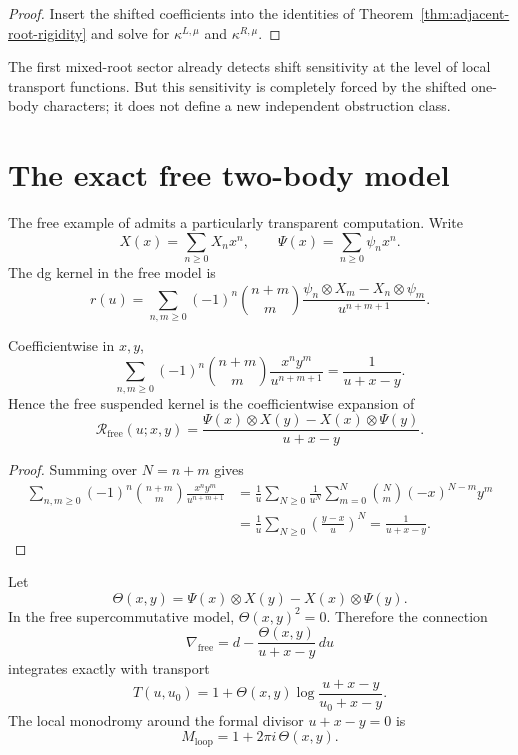 \begin{proof}
Insert the shifted coefficients into the identities of
Theorem~\ref{thm:adjacent-root-rigidity} and solve for
$\kappa^{L,\mu}$ and $\kappa^{R,\mu}$.
\end{proof}

\begin{interpretation}
The first mixed-root sector already detects shift sensitivity at the
level of local transport functions. But this sensitivity is completely
forced by the shifted one-body characters; it does not define a new
independent obstruction class.
\end{interpretation}

\section{The exact free two-body model}

The free example of \cite{DNP25} admits a particularly transparent
computation. Write
\[
X(x)=\sum_{n\ge 0} X_n x^n,
\qquad
\Psi(x)=\sum_{n\ge 0} \psi_n x^n.
\]
The dg kernel in the free model is
\[
r(u)=\sum_{n,m\ge 0}(-1)^n\binom{n+m}{m}
\frac{\psi_n\otimes X_m-X_n\otimes \psi_m}{u^{n+m+1}}.
\]

\begin{lemma}
\ClaimStatusProvedHere
\label{lem:free-closed-generating-kernel}
Coefficientwise in $x,y$,
\[
\sum_{n,m\ge 0}(-1)^n\binom{n+m}{m}\frac{x^n y^m}{u^{n+m+1}}
=
\frac{1}{u+x-y}.
\]
Hence the free suspended kernel is the coefficientwise expansion of
\[
\mathcal R_{\mathrm{free}}(u;x,y)=
\frac{\Psi(x)\otimes X(y)-X(x)\otimes \Psi(y)}{u+x-y}.
\]
\end{lemma}

\begin{proof}
Summing over $N=n+m$ gives
\begin{align*}
\sum_{n,m\ge 0}(-1)^n\binom{n+m}{m}\frac{x^n y^m}{u^{n+m+1}}
&=
\frac1u\sum_{N\ge 0}\frac1{u^N}
\sum_{m=0}^N \binom{N}{m}(-x)^{N-m}y^m\\
&=
\frac1u\sum_{N\ge 0}\left(\frac{y-x}{u}\right)^N
=
\frac{1}{u+x-y}.
\end{align*}
\end{proof}

\begin{theorem}
\ClaimStatusProvedHere
\label{thm:exact-free-transport}
Let
\[
\Theta(x,y)=\Psi(x)\otimes X(y)-X(x)\otimes \Psi(y).
\]
In the free supercommutative model, $\Theta(x,y)^2=0$. Therefore the
connection
\[
\nabla_{\mathrm{free}}=d-
\frac{\Theta(x,y)}{u+x-y}\,du
\]
integrates exactly with transport
\[
T(u,u_0)=1+\Theta(x,y)\log\!\frac{u+x-y}{u_0+x-y}.
\]
The local monodromy around the formal divisor $u+x-y=0$ is
\[
M_{\mathrm{loop}}=1+2\pi i\,\Theta(x,y).
\]
\end{theorem}

